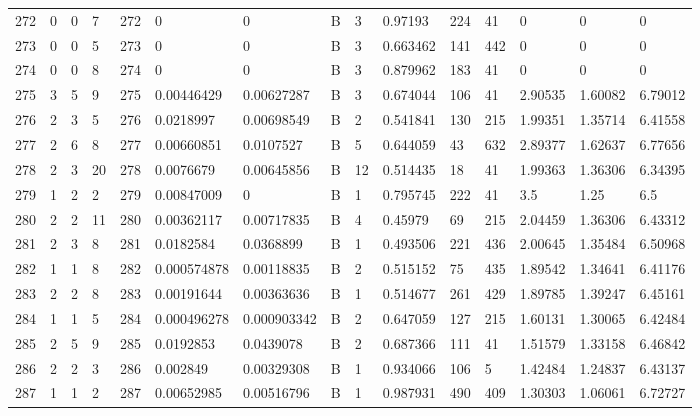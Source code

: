 \begin{latin}
\begin{longtable}{lllllllllllllll}
	272 & 0  & 0   & 7  & 272 & 0              & 0              & B & 3  & 0.97193  & 224  & 41   & 0       & 0       & 0       \\
	273 & 0  & 0   & 5  & 273 & 0              & 0              & B & 3  & 0.663462 & 141  & 442  & 0       & 0       & 0       \\
	274 & 0  & 0   & 8  & 274 & 0              & 0              & B & 3  & 0.879962 & 183  & 41   & 0       & 0       & 0       \\
	275 & 3  & 5   & 9  & 275 & 0.00446429     & 0.00627287     & B & 3  & 0.674044 & 106  & 41   & 2.90535 & 1.60082 & 6.79012 \\
	276 & 2  & 3   & 5  & 276 & 0.0218997      & 0.00698549     & B & 2  & 0.541841 & 130  & 215  & 1.99351 & 1.35714 & 6.41558 \\
	277 & 2  & 6   & 8  & 277 & 0.00660851     & 0.0107527      & B & 5  & 0.644059 & 43   & 632  & 2.89377 & 1.62637 & 6.77656 \\
	278 & 2  & 3   & 20 & 278 & 0.0076679      & 0.00645856     & B & 12 & 0.514435 & 18   & 41   & 1.99363 & 1.36306 & 6.34395 \\
	279 & 1  & 2   & 2  & 279 & 0.00847009     & 0              & B & 1  & 0.795745 & 222  & 41   & 3.5     & 1.25    & 6.5     \\
	280 & 2  & 2   & 11 & 280 & 0.00362117     & 0.00717835     & B & 4  & 0.45979  & 69   & 215  & 2.04459 & 1.36306 & 6.43312 \\
	281 & 2  & 3   & 8  & 281 & 0.0182584      & 0.0368899      & B & 1  & 0.493506 & 221  & 436  & 2.00645 & 1.35484 & 6.50968 \\
	282 & 1  & 1   & 8  & 282 & 0.000574878    & 0.00118835     & B & 2  & 0.515152 & 75   & 435  & 1.89542 & 1.34641 & 6.41176 \\
	283 & 2  & 2   & 8  & 283 & 0.00191644     & 0.00363636     & B & 1  & 0.514677 & 261  & 429  & 1.89785 & 1.39247 & 6.45161 \\
	284 & 1  & 1   & 5  & 284 & 0.000496278    & 0.000903342    & B & 2  & 0.647059 & 127  & 215  & 1.60131 & 1.30065 & 6.42484 \\
	285 & 2  & 5   & 9  & 285 & 0.0192853      & 0.0439078      & B & 2  & 0.687366 & 111  & 41   & 1.51579 & 1.33158 & 6.46842 \\
	286 & 2  & 2   & 3  & 286 & 0.002849       & 0.00329308     & B & 1  & 0.934066 & 106  & 5    & 1.42484 & 1.24837 & 6.43137 \\
	287 & 1  & 1   & 2  & 287 & 0.00652985     & 0.00516796     & B & 1  & 0.987931 & 490  & 409  & 1.30303 & 1.06061 & 6.72727 \\

\end{longtable}
\end{latin}
